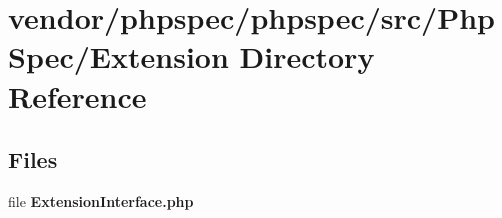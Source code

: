 \section{vendor/phpspec/phpspec/src/\+Php\+Spec/\+Extension Directory Reference}
\label{dir_4f8c60af72bea4efa0fcf42263563fba}
\subsection*{Files}
\begin{DoxyCompactItemize}
\item 
file {\bf Extension\+Interface.\+php}
\end{DoxyCompactItemize}
